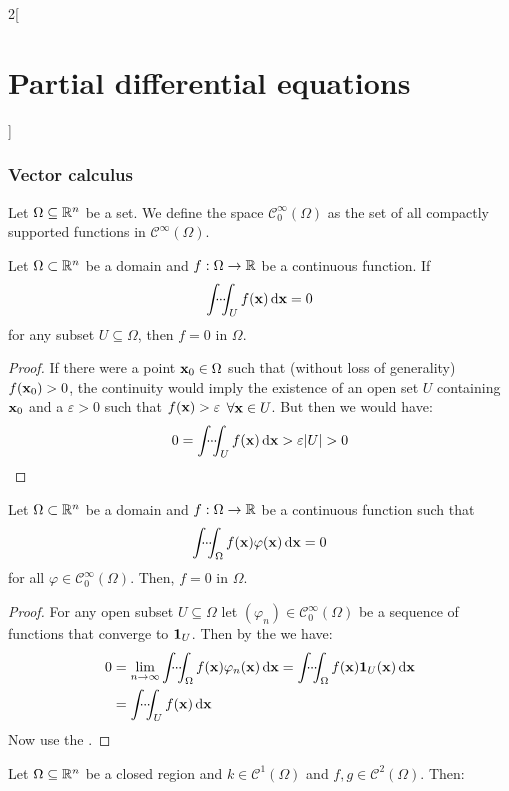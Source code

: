 \documentclass[../../../main_math.tex]{subfiles}
\begin{document}
\begin{multicols}{2}[\section{Partial differential equations}]
  \subsubsection{Vector calculus}
  \begin{definition}
    Let $\Omega\subseteq \mathbb{R}^n$ be a set. We define the space $\mathcal{C}_0^\infty(\Omega)$ as the set of all compactly supported functions in $\mathcal{C}^\infty(\Omega)$.
  \end{definition}
  \begin{important}
    \begin{theorem}\label{PDE:fundamentallemma}
      Let $\Omega\subset\mathbb{R}^n$ be a domain and $f:\Omega\rightarrow\mathbb{R}$ be a continuous function. If $$\dotsint_U f(\vf{x})\dd{\vf{x}}=0$$ for any subset  $U\subseteq\Omega$, then $f=0$ in $\Omega$.
    \end{theorem}
  \end{important}
  \begin{proof}
    If there were a point $\boldsymbol{\mathrm{x}}_0\in \Omega$ such that (without loss of generality) $f(\boldsymbol{\mathrm{x}}_0)>0$, the continuity would imply the existence of an open set $U$ containing $\boldsymbol{\mathrm{x}}_0$ and a $\varepsilon >0$ such that $f(\boldsymbol{\mathrm{x}})>\varepsilon$ $\forall \boldsymbol{\mathrm{x}}\in U$. But then we would have: $$0=\dotsint_U f(\vf{x})\dd{\vf{x}}>\varepsilon\abs{U}>0$$
  \end{proof}
  \begin{corollary}\label{PDE:postfundamentallemma}
    Let $\Omega\subset\mathbb{R}^n$ be a domain and $f:\Omega\rightarrow\mathbb{R}$ be a continuous function such that $$\dotsint_\Omega f(\vf{x})\varphi(\vf{x})\dd{\vf{x}}=0$$ for all $\varphi\in\mathcal{C}_0^\infty(\Omega)$. Then, $f=0$ in $\Omega$.
  \end{corollary}
  \begin{proof}
    For any open subset $U\subseteq \Omega$ let $(\varphi_n)\in\mathcal{C}_0^\infty(\Omega)$ be a sequence of functions that converge to $\boldsymbol{\mathrm{1}}_{U}$. Then by the  we have:
    \begin{align*}
      0 & = \lim_{n\to\infty}\dotsint_\Omega f(\vf{x})\varphi_n(\vf{x})\dd{\vf{x}}=\dotsint_\Omega f(\vf{x})\indi{U}(\vf{x})\dd{\vf{x}} \\
        & =\dotsint_U f(\vf{x})\dd{\vf{x}}
    \end{align*}
    Now use the .
  \end{proof}
  \begin{proposition}
    Let $\Omega\subseteq\mathbb{R}^n$ be a closed region and $k\in\mathcal{C}^1(\Omega)$ and $f,g\in\mathcal{C}^2(\Omega)$. Then:

\end{proposition}
\end{multicols}
\end{document}
